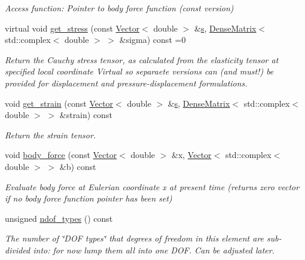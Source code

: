 \begin{DoxyCompactItemize}
\begin{DoxyCompactList}\small\item\em Access function\+: Pointer to body force function (const version) \end{DoxyCompactList}\item 
virtual void \hyperlink{classoomph_1_1TimeHarmonicLinearElasticityEquationsBase_a292db17379dfd457f5cc103acc3c5163}{get\+\_\+stress} (const \hyperlink{classoomph_1_1Vector}{Vector}$<$ double $>$ \&\hyperlink{cfortran_8h_ab7123126e4885ef647dd9c6e3807a21c}{s}, \hyperlink{classoomph_1_1DenseMatrix}{Dense\+Matrix}$<$ std\+::complex$<$ double $>$ $>$ \&sigma) const =0
\begin{DoxyCompactList}\small\item\em Return the Cauchy stress tensor, as calculated from the elasticity tensor at specified local coordinate Virtual so separaete versions can (and must!) be provided for displacement and pressure-\/displacement formulations. \end{DoxyCompactList}\item 
void \hyperlink{classoomph_1_1TimeHarmonicLinearElasticityEquationsBase_af64915acc72c5216fb3522825d93a048}{get\+\_\+strain} (const \hyperlink{classoomph_1_1Vector}{Vector}$<$ double $>$ \&\hyperlink{cfortran_8h_ab7123126e4885ef647dd9c6e3807a21c}{s}, \hyperlink{classoomph_1_1DenseMatrix}{Dense\+Matrix}$<$ std\+::complex$<$ double $>$ $>$ \&strain) const
\begin{DoxyCompactList}\small\item\em Return the strain tensor. \end{DoxyCompactList}\item 
void \hyperlink{classoomph_1_1TimeHarmonicLinearElasticityEquationsBase_a18016f2870b5e0ef5462058fb7dd0b87}{body\+\_\+force} (const \hyperlink{classoomph_1_1Vector}{Vector}$<$ double $>$ \&x, \hyperlink{classoomph_1_1Vector}{Vector}$<$ std\+::complex$<$ double $>$ $>$ \&b) const
\begin{DoxyCompactList}\small\item\em Evaluate body force at Eulerian coordinate x at present time (returns zero vector if no body force function pointer has been set) \end{DoxyCompactList}\item 
unsigned \hyperlink{classoomph_1_1TimeHarmonicLinearElasticityEquationsBase_a8008c586eb05403bef38a8d2fe421417}{ndof\+\_\+types} () const
\begin{DoxyCompactList}\small\item\em The number of \char`\"{}\+D\+O\+F types\char`\"{} that degrees of freedom in this element are sub-\/divided into\+: for now lump them all into one D\+OF. Can be adjusted later. \end{DoxyCompactList}\item 

\end{DoxyCompactItemize}
